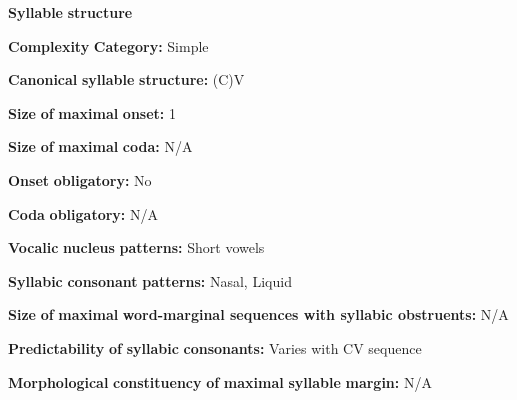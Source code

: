 \begin{styleBody}
\textbf{Syllable} \textbf{structure}
\end{styleBody}

\begin{styleBody}
\textbf{Complexity} \textbf{Category:} Simple
\end{styleBody}

\begin{styleBody}
\textbf{Canonical} \textbf{syllable} \textbf{structure:} (C)V \citep[30-2]{Gerner2013}
\end{styleBody}

\begin{styleBody}
\textbf{Size} \textbf{of} \textbf{maximal} \textbf{onset:} 1
\end{styleBody}

\begin{styleBody}
\textbf{Size} \textbf{of} \textbf{maximal} \textbf{coda:} N/A
\end{styleBody}

\begin{styleBody}
\textbf{Onset} \textbf{obligatory:} No
\end{styleBody}

\begin{styleBody}
\textbf{Coda} \textbf{obligatory:} N/A
\end{styleBody}

\begin{styleBody}
\textbf{Vocalic} \textbf{nucleus} \textbf{patterns:} Short vowels
\end{styleBody}

\begin{styleBody}
\textbf{Syllabic} \textbf{consonant} \textbf{patterns:} Nasal, Liquid
\end{styleBody}

\begin{styleBody}
\textbf{Size} \textbf{of} \textbf{maximal} \textbf{word{}-marginal sequences with syllabic obstruents:} N/A
\end{styleBody}

\begin{styleBody}
\textbf{Predictability} \textbf{of} \textbf{syllabic} \textbf{consonants:} Varies with CV sequence
\end{styleBody}

\begin{styleBody}
\textbf{Morphological} \textbf{constituency} \textbf{of} \textbf{maximal} \textbf{syllable} \textbf{margin:} N/A
\end{styleBody}

